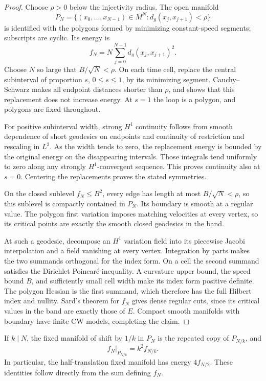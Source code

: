 \begin{proof}
Choose \(\rho>0\) below the injectivity radius.  The open manifold
\[
 P_N=\{(x_0,\ldots,x_{N-1})\in M^N:
                       d_g(x_j,x_{j+1})<\rho\}
\]
is identified with the polygons formed by minimizing constant-speed
segments; subscripts are cyclic.  Its energy is
\[
 f_N=N\sum_{j=0}^{N-1}d_g(x_j,x_{j+1})^2.
\]
Choose \(N\) so large that \(B/\sqrt N<\rho\).  On each time cell,
replace the central subinterval of proportion \(s\), \(0\le s\le1\),
by its minimizing segment.  Cauchy--Schwarz makes all endpoint
distances shorter than \(\rho\), and shows that this replacement does
not increase energy.  At \(s=1\) the loop is a polygon, and polygons
are fixed throughout.

For positive subinterval width, strong \(H^1\) continuity follows from
smooth dependence of short geodesics on endpoints and continuity of
restriction and rescaling in \(L^2\).  As the width tends to zero, the
replacement energy is bounded by the original energy on the
disappearing intervals.  Those integrals tend uniformly to zero along
any strongly \(H^1\)-convergent sequence.  This proves continuity also
at \(s=0\).  Centering the replacements proves the stated symmetries.

On the closed sublevel \(f_N\le B^2\), every edge has length at most
\(B/\sqrt N<\rho\), so this sublevel is compactly contained in \(P_N\).
Its boundary is smooth at a regular value.  The polygon first
variation imposes matching velocities at every vertex, so its
critical points are exactly the smooth closed geodesics in the band.

At such a geodesic, decompose an \(H^1\) variation field into its
piecewise Jacobi interpolation and a field vanishing at every
vertex.  Integration by parts makes the two summands orthogonal for
the index form.  On a cell the second summand satisfies the
Dirichlet Poincar\'e inequality.  A curvature upper bound, the speed
bound \(B\), and sufficiently small cell width make its index form
positive definite.  The polygon Hessian is the first summand, which
therefore has the full Hilbert index and nullity.
Sard's theorem for \(f_N\) gives dense regular cuts, since its critical
values in the band are exactly those of \(E\).  Compact smooth
manifolds with boundary have finite CW models, completing the claim.
\end{proof}

If \(k\mid N\), the fixed manifold of shift by \(1/k\) in \(P_N\)
is the repeated copy of \(P_{N/k}\), and
\begin{equation}\label{eq:local-energy-scaling}
 f_N|_{P_{N/k}}=k^2f_{N/k}.
\end{equation}
In particular, the half-translation fixed manifold has energy
\(4f_{N/2}\).  These identities follow directly from the sum defining
\(f_N\).

